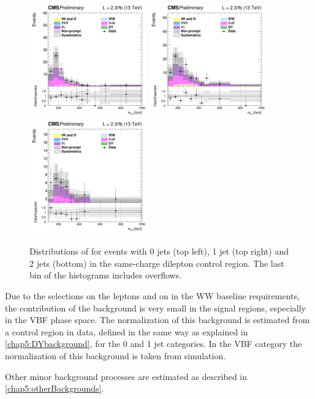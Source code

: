 \begin{figure}[htb]
\centering
\includegraphics[width=0.45\textwidth]{images/13TeV/HighMass/cratio_hww2l2v_13TeV_ss_of0j_mTi_0j.png}
\includegraphics[width=0.45\textwidth]{images/13TeV/HighMass/cratio_hww2l2v_13TeV_ss_of1j_mTi_1j.png}
\includegraphics[width=0.45\textwidth]{images/13TeV/HighMass/cratio_hww2l2v_13TeV_ss_of2j_mTi_VBF.png}
\caption{
Distributions of \mti for events with 0 jets (top left), 1 jet (top right) and 2 jets (bottom) in the same-charge dilepton
control region. The last bin of the histograms includes overflows. %
}
\label{fig:13TeV_hm_samesign}
\end{figure}

Due to the selections on the leptons \pt and on \mll in the WW baseline requirements, the contribution of the \dytt background is very small in the signal regions, especially in the VBF phase space. The normalization of this background is estimated from a control region in data, defined in the same way as explained in \ref{chap5:DYbackground}, for the 0 and 1 jet categories. In the VBF category the normalization of this background is taken from simulation.

Other minor background processes are estimated as described in \ref{chap5:otherBackgrounds}.














